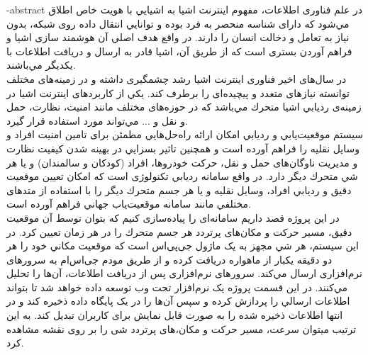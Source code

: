 
 
\surname{}

\fa-abstract{
در علم فناوری اطلاعات، مفهوم اينترنت اشيا به اشيايي با هويت خاص اطلاق مي‌شود كه دارای شناسه منحصر به فرد بوده و توانايي انتقال داده روی شبکه، بدون نياز به تعامل و دخالت انسان را دارند. در واقع هدف اصلي آن هوشمند سازی اشيا و فراهم آوردن بستری است كه از طريق آن،
اشيا قادر به ارسال و دريافت اطلاعات با يکديگر مي‌باشند.
\\
در سال‌های اخير فناوری اينترنت اشيا رشد چشمگيری داشته و در زمينه‌های مختلف توانسته نيازهای متعدد و پيچيده‌ای را برطرف كند. يکي از كاربردهای اينترنت اشيا در زمينه‌ی ‌‌رديابي اشيا متحرك مي‌باشد كه در حوزه‌های مختلف مانند امنيت، نظارت، حمل و نقل و ... مي‌تواند مورد استفاده قرار گيرد.
\\
سيستم موقعيت‌يابي و رديابي امکان ارائه راه‌حل‌هايي مطمئن برای تامين امنيت افراد و وسايل نقليه را فراهم آورده است و همچنين تاثير بسزايي در بهينه شدن كيفيت نظارت و مديريت ناوگان‌های حمل و نقل، حركت خودروها، افراد (کودکان و سالمندان) و يا هر شي متحرك ديگر دارد. در واقع سامانه رديابي تکنولوژی است كه امکان تعيين موقعيت دقيق و رديابي افراد، وسايل نقليه و يا هر جسم متحرك ديگر را با استفاده از متدهای مختلفي مانند
سامانه موقعيت‌ياب جهاني فراهم آورده است.
\\
در اين پروژه قصد داريم سامانه‌ای را پياده‌سازی كنيم كه بتوان توسط آن موقعيت دقيق، مسير حركت و مکان‌های پرتردد هر جسم متحرك را در هر زمان تعیین کرد. در اين سيستم، هر شي مجهز به يک ماژول جی‌پی‌اس است كه موقعيت مکاني خود را هر دو دقیقه یکبار از ماهواره دریافت کرده و از طريق مودم جی‌اس‌ام به سرورهای نرم‌افزاری ارسال مي‌كند. سرورهای نرم‌افزاری پس از دريافت اطلاعات، آن‌ها را تحليل مي‌كنند. در اين قسمت پروژه يک نرم‌افزار تحت وب توسعه داده خواهد شد تا بتواند اطلاعات ارسالي را پردازش كرده و سپس آن‌ها را در يک پايگاه داده ذخيره كند و در انتها اطلاعات ذخيره شده را به صورت قابل نمايش برای كاربران تبديل كند. به اين ترتيب ميتوان سرعت، مسير حرکت و مکان،های پرتردد شی را بر روی نقشه مشاهده کرد.
}


